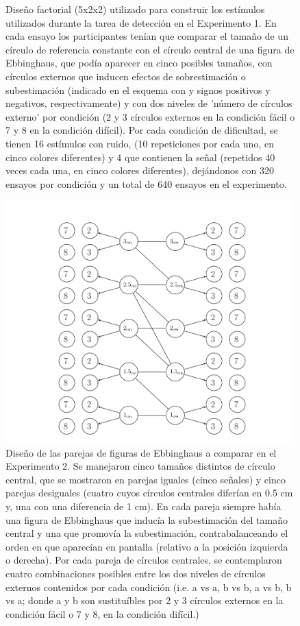 \begin{figure}[th]
\caption[Diseño de Estimulos en el Experimento 1]{Diseño factorial (5x2x2) utilizado para construir los estímulos utilizados durante la tarea de detección en el Experimento 1. En cada ensayo los participantes tenían que comparar el tamaño de un círculo de referencia constante con el círculo central de una figura de Ebbinghaus, que podía aparecer en cinco posibles tamaños, con círculos externos que inducen efectos de sobrestimación o subestimación (indicado en el esquema con  y signos positivos y negativos, respectivamente) y con dos niveles de 'número de círculos externo' por condición (2 y 3 círculos externos en la condición fácil o 7 y 8 en la condición difícil). Por cada condición de dificultad, se tienen 16 estímulos con ruido, (10 repeticiones por cada uno, en cinco colores diferentes) y 4 que contienen la señal (repetidos 40 veces cada una, en cinco colores diferentes), dejándonos con 320 ensayos por condición y un total de 640 ensayos en el experimento.}
\label{fig:Exp_1}
\end{figure}


\begin{figure}[th]
\centering
\includegraphics[width=0.99\textwidth]{Figures/Estimulos_Experimento2} 
\decoRule
\caption[Diseño de Estimulos en el Experimento 2]{Diseño de las parejas  de figuras de Ebbinghaus a comparar en el Experimento 2. Se manejaron cinco tamaños distintos de círculo central, que se mostraron en parejas iguales (cinco señales) y cinco parejas desiguales (cuatro cuyos círculos centrales diferían en 0.5 cm y, una con una diferencia de 1 cm). En cada pareja siempre había una figura de Ebbinghaus que inducía la subestimación del tamaño central y una que promovía la subestimación, contrabalanceando el orden en que aparecían en pantalla (relativo a la posición izquierda o derecha). Por cada pareja de círculos centrales, se contemplaron cuatro combinaciones posibles entre los dos niveles de círculos externos contenidos por cada condición (i.e. a vs a, b vs b, a vs b, b vs a; donde a y b son sustituíbles por 2 y 3 círculos externos en la condición fácil o 7 y 8, en la condición difícil.)}
\label{fig:Exp_2}
\end{figure}


